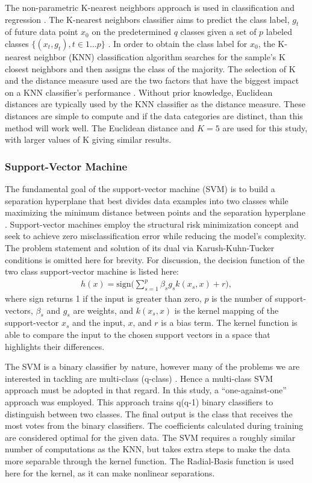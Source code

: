 The non-parametric K-nearest neighbors approach is used in classification 
and regression \cite{Vaishnnave12019}.
The K-nearest neighbors classifier aims to predict the class label, $g_t$ of 
future data point $x_0$ on the predetermined $q$ classes given a set 
of $p$ labeled classes $\{(x_t, g_t), t \in 1 \ldots p\}$ \cite{Song2007}. 
In order to obtain the class label for $x_0$, the K-nearest neighbor (KNN)
 classification algorithm searches for the sample's K closest neighbors 
 and then assigns the class of the majority.
The selection of K and the distance measure used are the two factors 
that have the biggest impact on a KNN classifier's performance \cite{Alf2019}. 
Without prior knowledge, Euclidean distances are typically used by the KNN classifier 
as the distance measure. These distances are simple to compute and if the data
categories are distinct, than this method will work well.
The Euclidean distance and $K=5$ are used for this study, with larger values of K giving similar results.

\subsubsection{Support-Vector Machine}

The fundamental goal of the support-vector machine (SVM) is to build a separation hyperplane that best divides
 data examples into two classes while maximizing the minimum distance between points
 and the separation hyperplane \cite{lazarevic2009support}. 
Support-vector machines employ the structural risk minimization \cite{sewell2008structural}
 concept and seek to achieve zero misclassification error while reducing the 
 model's complexity. 
The problem statement and solution of its dual via Karush-Kuhn-Tucker conditions \cite{Lange2013}
is omitted here for brevity. 
For discussion, the decision function of the two class support-vector machine is listed here:
\begin{align}
h(x) = \mathrm{sign} \bigg( \sum_{s=1}^p \beta_s g_s k(x_s, x) + r \bigg),
\end{align}
where sign returns 1 if the input is greater than zero, $p$ is the number of support-vectors, 
$\beta_s$ and $g_s$ are weights, and $k(x_s, x)$ is the kernel mapping of the support-vector $x_s$ and the input, $x$, and $r$ is a bias term.
The kernel function is able to compare the input to the chosen support vectors in a space that highlights their differences.

The SVM is a binary classifier by nature, however many of the problems 
we are interested in tackling are multi-class (q-class) \cite{Oskoei08}.
 Hence a multi-class SVM approach must be adopted in that regard. 
In this study, a “one-against-one” approach \cite{Debnath2004} was employed. 
This approach trains q(q-1) binary classifiers to distinguish between two classes. 
The final output is the class that receives the most votes from 
the binary classifiers. 
The coefficients calculated during training are considered optimal for the given data. 
The SVM requires a roughly similar number of computations as the KNN, but takes extra steps to 
make the data more separable through the kernel function.
The Radial-Basis function is used here for the kernel, as it can make nonlinear separations.

